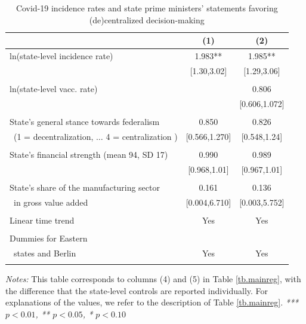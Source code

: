\begin{table}[htbp] 
\centering
\caption{Covid-19 incidence rates and state prime ministers' statements favoring (de)centralized decision-making}
 \label{tb.appendixtable}
	\begin{tabular}{lcc} \toprule
		& (1) & (2)  \\ \midrule
ln(state-level incidence rate) & 1.983** & 1.985** \\
	&	[1.30,3.02]  & [1.29,3.06] \\
  & & \\
ln(state-level vacc. rate) & & 0.806 \\
		&  & [0.606,1.072] \\
   & & \\
State's general stance towards federalism & 0.850 & 0.826 \\
\, (1 = decentralization, $\ldots$ 4 = centralization ) & [0.566,1.270] & [0.548,1.24] \\
 & & \\
State's financial strength (mean 94, SD 17) & 0.990 & 0.989 \\
        & [0.968,1.01] & [0.967,1.01] \\
         & & \\
State's share of the manufacturing sector  & 0.161 & 0.136 \\
\, in gross value added        & [0.004,6.710] & [0.003,5.752]  \\ 
		& &  \\
Linear time trend & Yes & Yes \\
		& &  \\
Dummies for Eastern  &    &     \\
\,  states and Berlin  & Yes & Yes \\ 
		& &  \\ \bottomrule 
	\end{tabular}
\begin{minipage}{\textwidth}
\small
\textit{Notes:} 
This table corresponds to columns (4) and (5) in Table \ref{tb.mainreg}, with the difference that the state-level controls are reported individually. For explanations of the values, we refer to the description of Table \ref{tb.mainreg}.
 \newline \textit{*** $p < 0.01$, ** $p < 0.05$, * $p < 0.10$}
	\end{minipage}
\end{table}